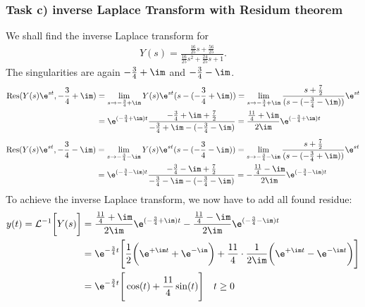 \subsubsection{Task c) inverse Laplace Transform with Residum theorem}
We shall find the inverse Laplace transform for
\begin{align}
	Y(s) = \frac{\frac{16}{25}s+\frac{56}{25}}{\frac{16}{25}s^2+\frac{24}{25}s+1}.
\end{align}
The singularities are again $-\frac{3}{4}+\im$ and $-\frac{3}{4}-\im$.
\begin{align}
	\mathrm{Res}(Y(s)\e^{st},-\frac{3}{4}+\im)&=\lim\limits_{s\rightarrow-\frac{3}{4}+\im}Y(s)\e^{st}(s-(-\frac{3}{4}+\im))=\lim\limits_{s\rightarrow-\frac{3}{4}+\im}\frac{s+\frac{7}{2}}{(s-(-\frac{3}{4}-\im))}\e^{st}\nonumber \\
	&=\e^{(-\frac{3}{4}+\im)t}\frac{-\frac{3}{4}+\im+\frac{7}{2}}{-\frac{3}{4}+\im-(-\frac{3}{4}-\im)}=\frac{\frac{11}{4}+\im}{2\im}\e^{(-\frac{3}{4}+\im)t}
\end{align}
\begin{align}
	\mathrm{Res}(Y(s)\e^{st},-\frac{3}{4}-\im)&=\lim\limits_{s\rightarrow-\frac{3}{4}-\im}Y(s)\e^{st}(s-(-\frac{3}{4}-\im))=\lim\limits_{s\rightarrow-\frac{3}{4}-\im}\frac{s+\frac{7}{2}}{(s-(-\frac{3}{4}+\im))}\e^{st}\nonumber \\
	&=\e^{(-\frac{3}{4}-\im)t}\frac{-\frac{3}{4}-\im+\frac{7}{2}}{-\frac{3}{4}-\im-(-\frac{3}{4}-\im)}=-\frac{\frac{11}{4}-\im}{2\im}\e^{(-\frac{3}{4}-\im)t}
\end{align}
To achieve the inverse Laplace transform, we now have to add all found residue:
\begin{align}
	y(t)=\mathcal{L}^{-1}\bigg [Y(s)\bigg]&=\frac{\frac{11}{4}+\im}{2\im}\e^{(-\frac{3}{4}+\im)t}-\frac{\frac{11}{4}-\im}{2\im}\e^{(-\frac{3}{4}-\im)t}\nonumber \\
	&=\e^{-\frac{3}{4}t}\Bigg [\frac{1}{2}\bigg (\e^{+\im t}+\e^{-\im} \bigg )+\frac{11}{4}\cdot\frac{1}{2\im}\bigg (\e^{+\im t}-\e^{-\im t} \bigg )\Bigg ]\nonumber \\
	&= \e^{-\frac{3}{4}t}\Bigg [\cos(t)+\frac{11}{4}\sin(t)\Bigg ] \quad t \geq 0
\end{align}
